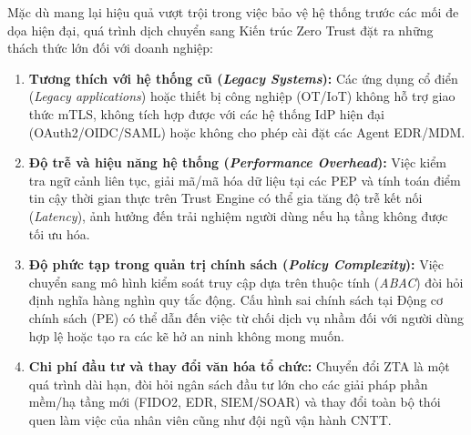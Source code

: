 Mặc dù mang lại hiệu quả vượt trội trong việc bảo vệ hệ thống trước các mối đe dọa hiện đại, quá trình dịch chuyển sang Kiến trúc Zero Trust đặt ra những thách thức lớn đối với doanh nghiệp:

\begin{enumerate}
    \item \textbf{Tương thích với hệ thống cũ (\textit{Legacy Systems}):} Các ứng dụng cổ điển (\textit{Legacy applications}) hoặc thiết bị công nghiệp (OT/IoT) không hỗ trợ giao thức mTLS, không tích hợp được với các hệ thống IdP hiện đại (OAuth2/OIDC/SAML) hoặc không cho phép cài đặt các Agent EDR/MDM.
    \item \textbf{Độ trễ và hiệu năng hệ thống (\textit{Performance Overhead}):} Việc kiểm tra ngữ cảnh liên tục, giải mã/mã hóa dữ liệu tại các PEP và tính toán điểm tin cậy thời gian thực trên Trust Engine có thể gia tăng độ trễ kết nối (\textit{Latency}), ảnh hưởng đến trải nghiệm người dùng nếu hạ tầng không được tối ưu hóa.
    \item \textbf{Độ phức tạp trong quản trị chính sách (\textit{Policy Complexity}):} Việc chuyển sang mô hình kiểm soát truy cập dựa trên thuộc tính (\textit{ABAC}) đòi hỏi định nghĩa hàng nghìn quy tắc động. Cấu hình sai chính sách tại Động cơ chính sách (PE) có thể dẫn đến việc từ chối dịch vụ nhầm đối với người dùng hợp lệ hoặc tạo ra các kẽ hở an ninh không mong muốn.
    \item \textbf{Chi phí đầu tư và thay đổi văn hóa tổ chức:} Chuyển đổi ZTA là một quá trình dài hạn, đòi hỏi ngân sách đầu tư lớn cho các giải pháp phần mềm/hạ tầng mới (FIDO2, EDR, SIEM/SOAR) và thay đổi toàn bộ thói quen làm việc của nhân viên cũng như đội ngũ vận hành CNTT.
\end{enumerate}